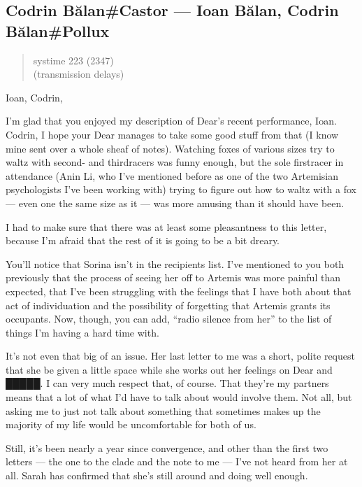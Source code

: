 \hypertarget{codrin-bux103lancastor-ioan-bux103lan-codrin-bux103lanpollux}{%
\subsection{Codrin Bălan\#Castor — Ioan Bălan, Codrin Bălan\#Pollux}\label{codrin-bux103lancastor-ioan-bux103lan-codrin-bux103lanpollux}}

\begin{quote}
systime 223 (2347)\\
(transmission delays)
\end{quote}

Ioan, Codrin,

I'm glad that you enjoyed my description of Dear's recent performance, Ioan. Codrin, I hope your Dear manages to take some good stuff from that (I know mine sent over a whole sheaf of notes). Watching foxes of various sizes try to waltz with second- and thirdracers was funny enough, but the sole firstracer in attendance (Anin Li, who I've mentioned before as one of the two Artemisian psychologists I've been working with) trying to figure out how to waltz with a fox — even one the same size as it — was more amusing than it should have been.

I had to make sure that there was at least some pleasantness to this letter, because I'm afraid that the rest of it is going to be a bit dreary.

You'll notice that Sorina isn't in the recipients list. I've mentioned to you both previously that the process of seeing her off to Artemis was more painful than expected, that I've been struggling with the feelings that I have both about that act of individuation and the possibility of forgetting that Artemis grants its occupants. Now, though, you can add, ``radio silence from her'' to the list of things I'm having a hard time with.

It's not even that big of an issue. Her last letter to me was a short, polite request that she be given a little space while she works out her feelings on Dear and █████. I can very much respect that, of course. That they're my partners means that a lot of what I'd have to talk about would involve them. Not all, but asking me to just not talk about something that sometimes makes up the majority of my life would be uncomfortable for both of us.

Still, it's been nearly a year since convergence, and other than the first two letters — the one to the clade and the note to me — I've not heard from her at all. Sarah has confirmed that she's still around and doing well enough.

